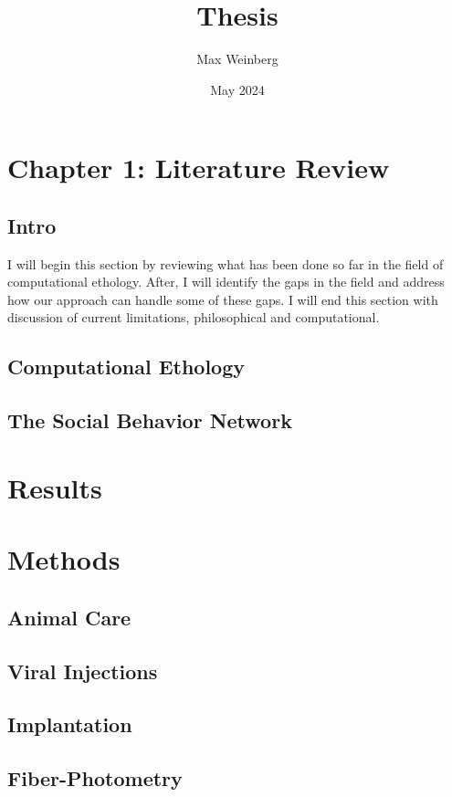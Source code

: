 \documentclass[12pt,english]{article}
\title{Thesis}
\author{Max Weinberg}
\date{May 2024}
\begin{document}
\maketitle
\section{Chapter 1: Literature Review}
\subsection{Intro}
I will begin this section by reviewing what has been done so far in the field of computational ethology. After, I will identify the gaps in the field and address how our approach can handle some of these gaps. I will end this section with discussion of current limitations, philosophical and computational. %
\subsection{Computational Ethology}



\subsection{The Social Behavior Network}

\section{Results}

\section{Methods}

\subsection{Animal Care}

\subsection{Viral Injections}

\subsection{Implantation}

\subsection{Fiber-Photometry}
\end{document}
